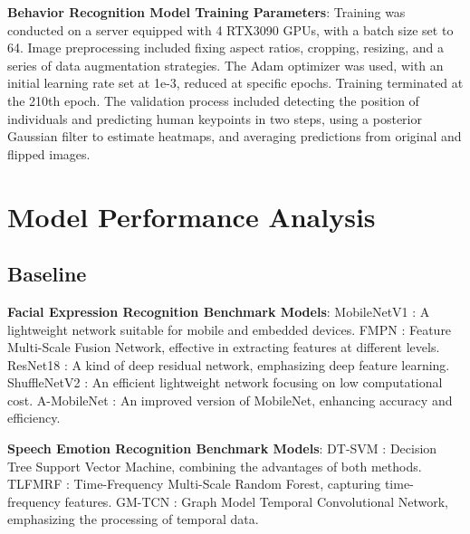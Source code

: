 \documentclass[preprint,12pt]{elsarticle}
\begin{document}
\textbf{Behavior Recognition Model Training Parameters}: Training was conducted on a server equipped with 4 RTX3090 GPUs, with a batch size set to 64. Image preprocessing included fixing aspect ratios, cropping, resizing, and a series of data augmentation strategies. The Adam optimizer was used, with an initial learning rate set at 1e-3, reduced at specific epochs. Training terminated at the 210th epoch. The validation process included detecting the position of individuals and predicting human keypoints in two steps, using a posterior Gaussian filter to estimate heatmaps, and averaging predictions from original and flipped images.



\section{Model Performance Analysis}

\subsection{Baseline}

\textbf{Facial Expression Recognition Benchmark Models}: MobileNetV1 \cite{ref56}: A lightweight network suitable for mobile and embedded devices. FMPN \cite{ref57}: Feature Multi-Scale Fusion Network, effective in extracting features at different levels. ResNet18 \cite{ref58}: A kind of deep residual network, emphasizing deep feature learning. ShuffleNetV2 \cite{ref59}: An efficient lightweight network focusing on low computational cost. A-MobileNet \cite{ref56}: An improved version of MobileNet, enhancing accuracy and efficiency.

\textbf{Speech Emotion Recognition Benchmark Models}: DT-SVM \cite{ref61}: Decision Tree Support Vector Machine, combining the advantages of both methods. TLFMRF \cite{ref62}: Time-Frequency Multi-Scale Random Forest, capturing time-frequency features. GM-TCN \cite{ref63}: Graph Model Temporal Convolutional Network, emphasizing the processing of temporal data.
\end{document}
